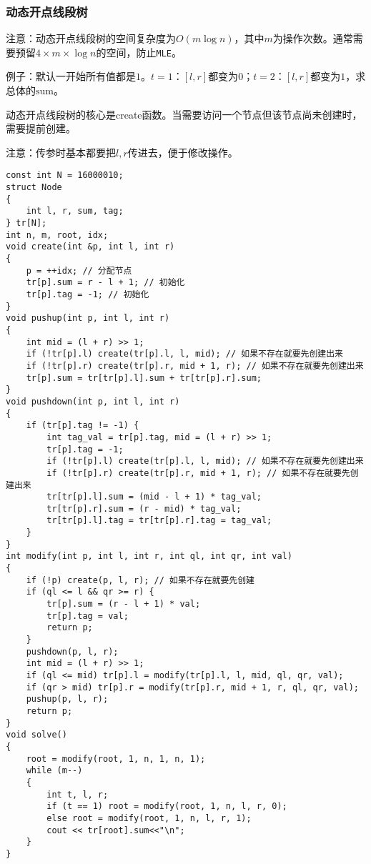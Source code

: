 \documentclass[a4paper, fontset=none]{ctexart}
\begin{document}
\subsubsection{动态开点线段树}
注意：动态开点线段树的空间复杂度为$O(m\log n)$，其中$m$为操作次数。通常需要预留$4 \times m \times \log n$的空间，防止\texttt{MLE}。

例子：默认一开始所有值都是$1$。$t=1$：$[l, r]$都变为$0$；$t=2$：$[l, r]$都变为$1$，求总体的$\text{sum}$。

动态开点线段树的核心是create函数。当需要访问一个节点但该节点尚未创建时，需要提前创建。

注意：传参时基本都要把$l, r$传进去，便于修改操作。

\begin{verbatim}
const int N = 16000010;
struct Node
{
    int l, r, sum, tag;
} tr[N];
int n, m, root, idx;
void create(int &p, int l, int r)
{
    p = ++idx; // 分配节点
    tr[p].sum = r - l + 1; // 初始化
    tr[p].tag = -1; // 初始化
}
void pushup(int p, int l, int r)
{
    int mid = (l + r) >> 1;
    if (!tr[p].l) create(tr[p].l, l, mid); // 如果不存在就要先创建出来
    if (!tr[p].r) create(tr[p].r, mid + 1, r); // 如果不存在就要先创建出来
    tr[p].sum = tr[tr[p].l].sum + tr[tr[p].r].sum;
}
void pushdown(int p, int l, int r)
{
    if (tr[p].tag != -1) {
        int tag_val = tr[p].tag, mid = (l + r) >> 1;
        tr[p].tag = -1;
        if (!tr[p].l) create(tr[p].l, l, mid); // 如果不存在就要先创建出来
        if (!tr[p].r) create(tr[p].r, mid + 1, r); // 如果不存在就要先创建出来
        tr[tr[p].l].sum = (mid - l + 1) * tag_val;
        tr[tr[p].r].sum = (r - mid) * tag_val;
        tr[tr[p].l].tag = tr[tr[p].r].tag = tag_val;
    }
}
int modify(int p, int l, int r, int ql, int qr, int val)
{
    if (!p) create(p, l, r); // 如果不存在就要先创建
    if (ql <= l && qr >= r) {
        tr[p].sum = (r - l + 1) * val;
        tr[p].tag = val;
        return p;
    }
    pushdown(p, l, r);
    int mid = (l + r) >> 1;
    if (ql <= mid) tr[p].l = modify(tr[p].l, l, mid, ql, qr, val);
    if (qr > mid) tr[p].r = modify(tr[p].r, mid + 1, r, ql, qr, val);
    pushup(p, l, r);
    return p;
}
void solve()
{
    root = modify(root, 1, n, 1, n, 1);
    while (m--)
    {
        int t, l, r;
        if (t == 1) root = modify(root, 1, n, l, r, 0);
        else root = modify(root, 1, n, l, r, 1);
        cout << tr[root].sum<<"\n";
    }
}
\end{verbatim}
\end{document}
